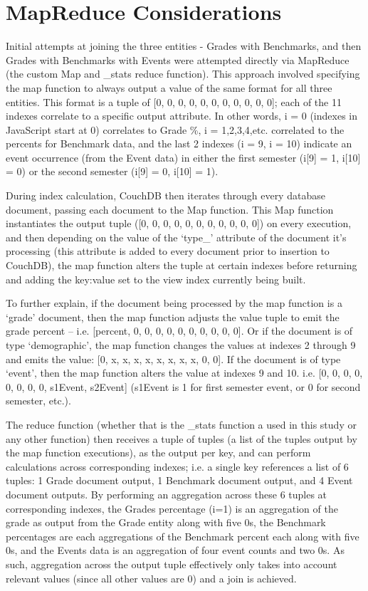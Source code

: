 


\section{MapReduce Considerations}
Initial attempts at joining the three entities - Grades with Benchmarks, and then Grades with Benchmarks with Events were attempted directly via MapReduce (the custom Map and \_stats reduce function). This approach involved specifying the map function to always output a value of the same format for all three entities. This format is a tuple of [0, 0, 0, 0, 0, 0, 0, 0, 0, 0, 0]; each of the 11 indexes correlate to a specific output attribute. In other words, i = 0 (indexes in JavaScript start at 0) correlates to Grade \%, i = 1,2,3,4,etc. correlated to the percents for Benchmark data, and the last 2 indexes (i = 9, i = 10) indicate an event occurrence (from the Event data) in either the first semester (i[9] = 1, i[10] = 0) or the second semester (i[9] = 0, i[10] = 1).

During index calculation, CouchDB then iterates through every database document, passing each document to the Map function. This Map function instantiates the output tuple ([0, 0, 0, 0, 0, 0, 0, 0, 0, 0, 0]) on every execution, and then depending on the value of the `type\_' attribute of the document it's processing (this attribute is added to every document prior to insertion to CouchDB), the map function alters the tuple at certain indexes before returning and adding the key:value set to the view index currently being built.

To further explain, if the document being processed by the map function is a ‘grade’ document, then the map function adjusts the value tuple to emit the grade percent – i.e. [percent, 0, 0, 0, 0, 0, 0, 0, 0, 0, 0]. Or if the document is of type ‘demographic’, the map function changes the values at indexes 2 through 9 and emits the value: [0, x, x, x, x, x, x, x, x, 0, 0]. If the document is of type ‘event’, then the map function alters the value at indexes 9 and 10. i.e. [0, 0, 0, 0, 0, 0, 0, 0, s1Event, s2Event] (s1Event is 1 for first semester event, or 0 for second semester, etc.).

The reduce function (whether that is the \_stats function a used in this study or any other function) then receives a tuple of tuples (a list of the tuples output by the map function executions), as the output per key, and can perform calculations across corresponding indexes; i.e. a single key references a list of 6 tuples: 1 Grade document output, 1 Benchmark document output, and 4 Event document outputs. By performing an aggregation across these 6 tuples at corresponding indexes, the Grades percentage (i=1) is an aggregation of the grade as output from the Grade entity along with five 0s, the Benchmark percentages are each aggregations of the Benchmark percent each along with five 0s, and the Events data is an aggregation of four event counts and two 0s. As such, aggregation across the output tuple effectively only takes into account relevant values (since all other values are 0) and a join is achieved.

